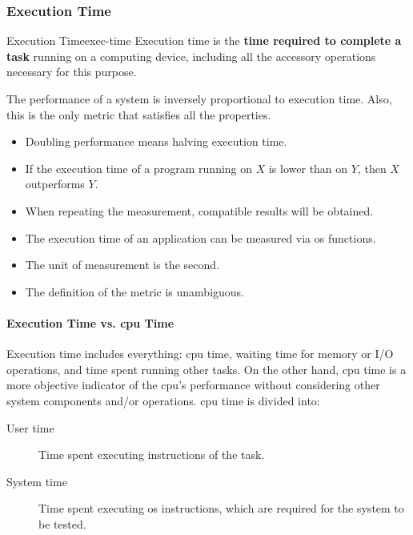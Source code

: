 \subsubsection{Execution Time}
\begin{definition}{Execution Time}{exec-time}
    Execution time is the \textbf{time required to complete a task} running on a computing device, including all the accessory operations necessary for this purpose. 
\end{definition}
The performance of a system is inversely proportional to execution time. Also, this is the only metric that satisfies all the properties.
\begin{itemize}
    \item Doubling performance means halving execution time.
    \item If the execution time of a program running on \(X\) is lower than on \(Y\), then \(X\) outperforms \(Y\).
    \item When repeating the measurement, compatible results will be obtained.
    \item The execution time of an application can be measured via \gls{os} functions.
    \item The unit of measurement is the second.
    \item The definition of the metric is unambiguous.
\end{itemize}

\paragraph{Execution Time vs. \gls{cpu} Time} 
Execution time includes everything: \gls{cpu} time, waiting time for memory or I/O operations, and time spent running other tasks. On the other hand, \gls{cpu} time is a more objective indicator of the \gls{cpu}'s performance without considering other system components and/or operations. \gls{cpu} time is divided into: 
\begin{description}
    \item[User time] Time spent executing instructions of the task.
    \item[System time] Time spent executing \gls{os} instructions, which are required for the system to be tested.
\end{description}

